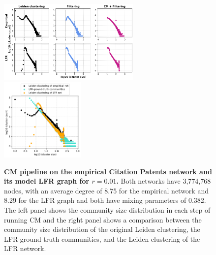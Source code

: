 \documentclass[11pt]{article}   	%
\begin{document}
\begin{figure}[h!]
\centering
\includegraphics[width=0.62\textwidth]{figs/cit_patents_cm_steps_lfr01.pdf}
\includegraphics[width=0.37\textwidth]{figs/cit_patents_01_cm_size.pdf}
\caption[CM pipeline on the empirical Citation Patents Network and its model LFR graph for r=0.01]{\textbf{CM pipeline on the empirical Citation Patents network and its model LFR graph for $r=0.01$.} Both networks have 3,774,768 nodes, with an average degree of 8.75 for the empirical network and 8.29 for the LFR graph and both have mixing parameters of 0.382. The left panel shows the community size distribution in each step of running CM and the right panel shows a comparison between the community size distribution of the original Leiden clustering, the LFR ground-truth communities, and the Leiden clustering of the LFR network.}
\label{fig:patents-cm-lfr-01}
\end{figure}
\end{document}

